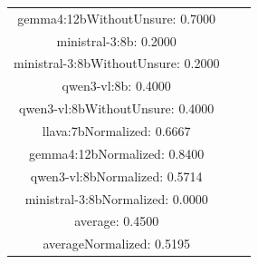 \documentclass[a4paper]{article}
\begin{document}
\begin{tabular}{ccc}
gemma4:12bWithoutUnsure: 0.7000 \\ ministral-3:8b: 0.2000 \\ ministral-3:8bWithoutUnsure: 0.2000 \\ qwen3-vl:8b: 0.4000 \\ qwen3-vl:8bWithoutUnsure: 0.4000 \\ llava:7bNormalized: 0.6667 \\ gemma4:12bNormalized: 0.8400 \\ qwen3-vl:8bNormalized: 0.5714 \\ ministral-3:8bNormalized: 0.0000 \\ average: 0.4500 \\ averageNormalized: 0.5195 \end{minipage}\\
\end{tabular}

\vspace{5mm}
\end{document}
